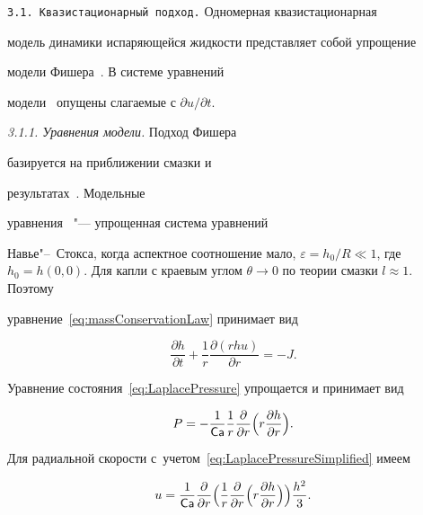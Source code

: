 \texttt{3.1. Квазистационарный подход.} Одномерная квазистационарная

модель динамики испаряющейся жидкости представляет собой упрощение

модели Фишера~\cite{Fischer2002}. В системе уравнений

модели~\cite{Fischer2002} опущены слагаемые с $\partial u/\partial

t$.



\smallskip

\textit{3.1.1. Уравнения модели.} Подход Фишера~\cite{Fischer2002}

базируется на приближении смазки и

результатах~\cite{EhrhardDavis1991}. Модельные

уравнения~\cite{Fischer2002} "--- упрощенная система уравнений

Навье"--~Стокса, когда аспектное соотношение мало, $\varepsilon =

h_0/R\ll 1$, где $h_0 = h(0, 0)$. Для капли с краевым углом $\theta

\to 0$ по теории смазки $l\approx 1$. Поэтому

уравнение~\eqref{eq:massConservationLaw} принимает вид

\begin{equation}\label{eq:massConservationLawSimplified}

\frac{\partial h}{\partial t} + \frac{1}{r}\frac{\partial

\left(rhu\right)}{\partial r} =  - J.

\end{equation}

Уравнение состояния~\eqref{eq:LaplacePressure} упрощается и принимает вид

\begin{equation}\label{eq:LaplacePressureSimplified}

P =  - \frac{1}{\Ca}\frac{1}{r}\frac{\partial }{\partial r} 

\Bigl(

r\frac{\partial h}{\partial r} \Bigr).

\end{equation}

Для радиальной скорости с~учетом~\eqref{eq:LaplacePressureSimplified} имеем

\begin{equation}\label{eq:capillaryFlowVelocity}

u = \frac{1}{\Ca}\frac{\partial }{\partial r}\Bigl(

\frac{1}{r}\frac{\partial } {\partial r}\Bigl(r\frac{\partial

h}{\partial r} \Bigr) \Bigr)\frac{h^2}{3}.

\end{equation}

